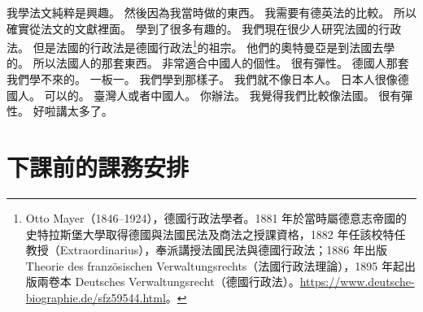\hypertarget{w01:cue:4131}{}我學法文純粹是興趣。
\hypertarget{w01:cue:4132}{}然後因為我當時做的東西。
\hypertarget{w01:cue:4133}{}我需要有德英法的比較。
\hypertarget{w01:cue:4134}{}所以確實從法文的文獻裡面。
\hypertarget{w01:cue:4135}{}學到了很多有趣的。
\hypertarget{w01:cue:4136}{}我們現在很少人研究法國的行政法。
\hypertarget{w01:cue:4137}{}但是法國的行政法是德國行政法\footnote{Otto Mayer（1846–1924），德國行政法學者。1881 年於當時屬德意志帝國的史特拉斯堡大學取得德國與法國民法及商法之授課資格，1882 年任該校特任教授（Extraordinarius），奉派講授法國民法與德國行政法；1886 年出版 Theorie des französischen Verwaltungsrechts（法國行政法理論），1895 年起出版兩卷本 Deutsches Verwaltungsrecht（德國行政法）。\url{https://www.deutsche-biographie.de/sfz59544.html}。}的祖宗。
\hypertarget{w01:cue:4138}{}他們的奧特曼亞是到法國去學的。
\hypertarget{w01:cue:4139}{}所以法國人的那套東西。
\hypertarget{w01:cue:4140}{}非常適合中國人的個性。
\hypertarget{w01:cue:4141}{}很有彈性。
\hypertarget{w01:cue:4142}{}德國人那套我們學不來的。
\hypertarget{w01:cue:4143}{}一板一。
\hypertarget{w01:cue:4144}{}我們學到那樣子。
\hypertarget{w01:cue:4145}{}我們就不像日本人。
\hypertarget{w01:cue:4146}{}日本人很像德國人。
\hypertarget{w01:cue:4147}{}可以的。
\hypertarget{w01:cue:4148}{}臺灣人或者中國人。
\hypertarget{w01:cue:4149}{}你辦法。
\hypertarget{w01:cue:4150}{}我覺得我們比較像法國。
\hypertarget{w01:cue:4151}{}很有彈性。
\hypertarget{w01:cue:4152}{}好啦講太多了。

\section{下課前的課務安排}

